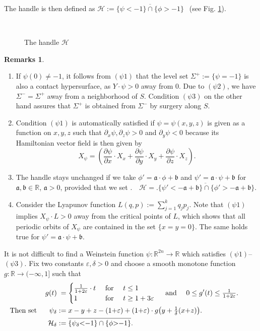 \documentclass[a4paper,12pt,bibliography=totocnumbered,titlepage=false,abstracton,bookmarksnumbered=true]{scrartcl}
\newcommand{\veps}{\varepsilon}
\theoremstyle{definition}
\newtheorem{remarks}[defn]{Remarks}
\begin{document}
The handle is then defined as $\mathcal{H}:=\overline{\{\psi{<} {-}1\}\cap\{\phi{>} {-}1\}}\;\,$ (see Fig. \ref{fig3}).
\begin{figure}[ht]
\centering
 \resizebox{10cm}{!}{}
 \\\caption{\label{fig3} The handle $\mathcal{H}$}
\end{figure}
\begin{remarks} ~\label{dislyapunov}
 \begin{enumerate}
  \item If $\psi(0)\neq -1$, it follows from $(\psi 1)$ that the level set $\Sigma^+:=\{\psi{=}{-}1\}$ is also a contact hypersurface, as $Y{\cdot} \psi > 0$ away from 0. Due to $(\psi 2)$, we have $\Sigma^-=\Sigma^+$ away from a neighborhood of $S$. Condition $(\psi 3)$ on the other hand assures that $\Sigma^+$ is obtained from $\Sigma^-$ by surgery along $S$.
  \item Condition $(\psi1)$ is automatically satisfied if $\psi=\psi(x,y,z)$ is given as a function on $x,y,z$ such that $\partial_x \psi,\partial_z \psi >0$ and $\partial_y \psi<0$ because its Hamiltonian vector field is then given by
  \[ X_\psi= \left(\frac{\partial \psi}{\partial x}{\cdot} X_x + \frac{\partial \psi}{\partial y}{\cdot} X_y + \frac{\partial \psi}{\partial z}{\cdot} X_z\right).\]
  \item The handle stays unchanged if we take $\phi'=\mathfrak{a}{\cdot} \phi + \mathfrak{b}$ and $\psi'=\mathfrak{a}{\cdot}\psi+\mathfrak{b}$ for $\mathfrak{a},\mathfrak{b}\in\mathbb{R}$, $\mathfrak{a}> 0$, provided that we set $\bigg.\quad \mathcal{H}=\overline{\big.\{\psi'{<} {-}\mathfrak{a}{+}\mathfrak{b}\}\cap\{\phi'{>} {-}\mathfrak{a}{+}\mathfrak{b}\}}$.
  \item  Consider the Lyapunov function $L(q,p):=\sum_{j=1}^k q_jp_j$. Note that $(\psi1)$ implies $X_{\psi}{\cdot} L>0$ away from the critical points of $L$, which shows that all periodic orbits of $X_{\psi}$ are contained in the set $\{x{=}y{=}0\}$. The same holds true for $\psi'=\mathfrak{a}{\cdot}\psi+\mathfrak{b}$.
 \end{enumerate}
\end{remarks}
It is not difficult to find a Weinstein function $\psi:\mathbb{R}^{2n}\rightarrow\mathbb{R}$ which satisfies $(\psi 1)$--$(\psi 3)$. Fix two constants $\veps,\delta>0$ and choose a smooth monotone function $g:\mathbb{R}\rightarrow (-\infty,1]$ such that
\begin{align}
 g(t) &\phantom{:}= \begin{cases}\frac{1}{1+2\veps}\cdot t& \text{ for }\quad t\leq 1\\ 1&\text{ for }\quad t\geq 1+ 3\veps\end{cases}\quad\text{ and }\quad 0\leq g'(t) \leq {\textstyle \frac{1}{1+2\veps}}.\notag\\
 \text{Then set }\hspace{0.5cm}\psi_\delta&:=x-y+z-(1{+}\veps)+(1{+}\veps)\cdot g\big(y+{\textstyle \frac{1}{\delta}}(x{+}z)\big).\label{eqXX}\hspace{2.5cm}\\
 \mathcal{H}_\delta&:=\overline{\big.\{\psi_\delta{<}{-}1\}\cap\{\phi{>}{-}1\}}.\notag
\end{align}
\end{document}
